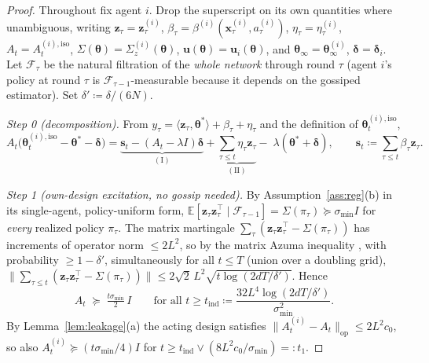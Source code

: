 \documentclass[11pt]{article}
\begin{document}
\begin{proof}
Throughout fix agent $i$. Drop the superscript on its own quantities
where unambiguous, writing $\bm z_\tau=\bm z_\tau^{(i)}$,
$\beta_\tau=\beta^{(i)}(\bm x_\tau^{(i)},a_\tau^{(i)})$,
$\eta_\tau=\eta_\tau^{(i)}$,
$A_t=A_t^{(i),\mathrm{iso}}$,
$\Sigma(\bm\theta)=\Sigma_z^{(i)}(\bm\theta)$,
$\bm u(\bm\theta)=\bm u_i(\bm\theta)$, and
$\bm\theta_\infty=\bm\theta_\infty^{(i)}$,
$\bm\delta=\bm\delta_i$.  Let $\mathcal F_\tau$ be the natural
filtration of the \emph{whole network} through round $\tau$ (agent
$i$'s policy at round $\tau$ is $\mathcal F_{\tau-1}$-measurable
because it depends on the gossiped estimator).  Set
$\delta'\coloneqq\delta/(6N)$.

\emph{Step 0 (decomposition).}  From
$y_\tau=\langle\bm z_\tau,\bm\theta^{\!*}\rangle+\beta_\tau+\eta_\tau$
and the definition of $\bm\theta_t^{(i),\mathrm{iso}}$,
\begin{equation}
A_t\bigl(\bm\theta_t^{(i),\mathrm{iso}}-\bm\theta^{\!*}-\bm\delta\bigr)
=\underbrace{\bm s_t-(A_t-\lambda I)\bm\delta}_{(\mathrm I)}
+\underbrace{\textstyle\sum_{\tau\leq t}\eta_\tau\bm z_\tau}_{(\mathrm{II})}
-\;\lambda(\bm\theta^{\!*}+\bm\delta),
\qquad
\bm s_t\coloneqq\sum_{\tau\leq t}\beta_\tau\bm z_\tau .
\label{eq:ind_decomp}
\end{equation}

\emph{Step 1 (own-design excitation, no gossip needed).}  By
Assumption~\ref{ass:reg}(b) in its single-agent, policy-uniform form,
$\mathbb E[\bm z_\tau\bm z_\tau^\top\mid\mathcal F_{\tau-1}]
=\Sigma(\pi_\tau)\succeq\sigma_{\min}I$ for \emph{every} realized
policy $\pi_\tau$.  The matrix martingale
$\sum_\tau(\bm z_\tau\bm z_\tau^\top-\Sigma(\pi_\tau))$ has increments
of operator norm $\leq 2L^2$, so by the matrix Azuma inequality
\citep{tropp2012}, with probability $\geq 1-\delta'$, simultaneously
for all $t\leq T$ (union over a doubling grid),
$\bigl\|\sum_{\tau\leq t}(\bm z_\tau\bm z_\tau^\top-\Sigma(\pi_\tau))\bigr\|
\leq 2\sqrt2\,L^2\sqrt{t\log(2dT/\delta')}$.
Hence
\begin{equation}
A_t\;\succeq\;\tfrac{t\sigma_{\min}}{2}\,I
\qquad\text{for all }t\geq
t_{\mathrm{ind}}\coloneqq\frac{32L^4\log(2dT/\delta')}{\sigma_{\min}^2}.
\label{eq:ind_excite}
\end{equation}
By Lemma~\ref{lem:leakage}(a) the acting design satisfies
$\|A_t^{(i)}-A_t\|_{\mathrm{op}}\leq 2L^2c_0$, so also
$A_t^{(i)}\succeq(t\sigma_{\min}/4)I$ for
$t\geq t_{\mathrm{ind}}\vee(8L^2c_0/\sigma_{\min})=:t_1$.


\end{proof}
\end{document}
